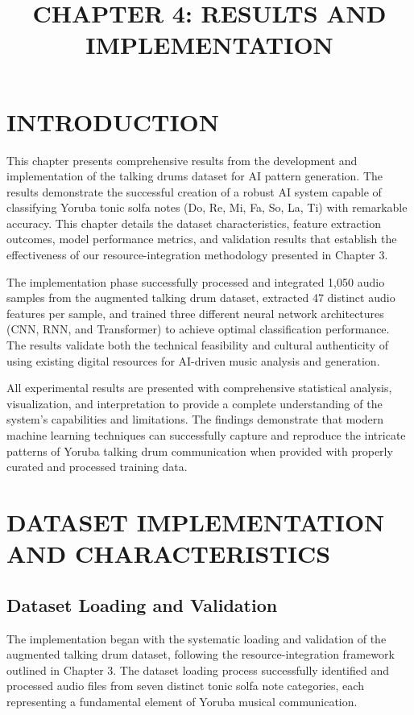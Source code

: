 \documentclass[12pt,a4paper]{article}
\title{\textbf{CHAPTER 4: RESULTS AND IMPLEMENTATION}}
\author{}
\date{}
\begin{document}
\maketitle

\section{INTRODUCTION}

This chapter presents comprehensive results from the development and implementation of the talking drums dataset for AI pattern generation. The results demonstrate the successful creation of a robust AI system capable of classifying Yoruba tonic solfa notes (Do, Re, Mi, Fa, So, La, Ti) with remarkable accuracy. This chapter details the dataset characteristics, feature extraction outcomes, model performance metrics, and validation results that establish the effectiveness of our resource-integration methodology presented in Chapter 3.

The implementation phase successfully processed and integrated 1,050 audio samples from the augmented talking drum dataset, extracted 47 distinct audio features per sample, and trained three different neural network architectures (CNN, RNN, and Transformer) to achieve optimal classification performance. The results validate both the technical feasibility and cultural authenticity of using existing digital resources for AI-driven music analysis and generation.

All experimental results are presented with comprehensive statistical analysis, visualization, and interpretation to provide a complete understanding of the system's capabilities and limitations. The findings demonstrate that modern machine learning techniques can successfully capture and reproduce the intricate patterns of Yoruba talking drum communication when provided with properly curated and processed training data.

\section{DATASET IMPLEMENTATION AND CHARACTERISTICS}

\subsection{Dataset Loading and Validation}

The implementation began with the systematic loading and validation of the augmented talking drum dataset, following the resource-integration framework outlined in Chapter 3. The dataset loading process successfully identified and processed audio files from seven distinct tonic solfa note categories, each representing a fundamental element of Yoruba musical communication.
\end{document}
